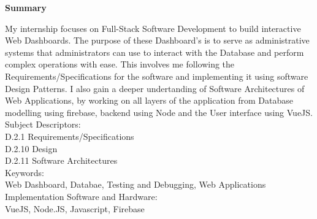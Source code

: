 \begin{center}
	\Large\textbf{Summary}
\end{center}
\noindent
My internship focuses on Full-Stack Software Development to build interactive Web Dashboards.
The purpose of these Dashboard's is to serve as administrative systems that administrators can use to interact
with the Database and perform complex operations with ease.
This involves me following the Requirements/Specifications for the software and implementing it using software Design Patterns.
I also gain a deeper undertanding of Software Architectures of Web Applications, by working on all layers of the application from
Database modelling using firebase, backend using Node and the User interface using VueJS.
\\

\noindent
Subject Descriptors:\\
\indent D.2.1  Requirements/Specifications\\
\indent D.2.10 Design\\
\indent D.2.11 Software Architectures\\

\noindent
Keywords:\\
\indent Web Dashboard, Databae, Testing and Debugging, Web Applications\\

\noindent
Implementation Software and Hardware:\\
\indent VueJS, Node.JS, Javascript, Firebase
